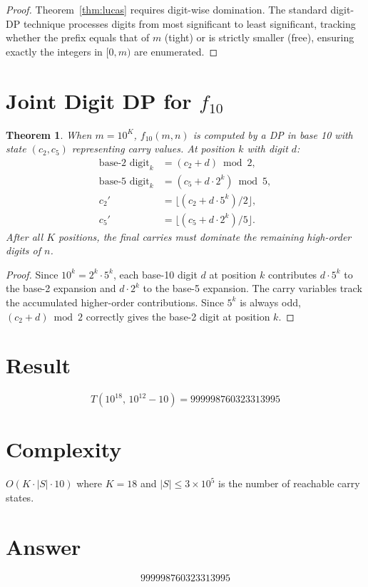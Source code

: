 \documentclass[12pt]{article}
\newtheorem{theorem}{Theorem}
\theoremstyle{definition}
\begin{document}
\begin{proof}
Theorem~\ref{thm:lucas} requires digit-wise domination.  The standard digit-DP technique processes digits from most significant to least significant, tracking whether the prefix equals that of $m$ (tight) or is strictly smaller (free), ensuring exactly the integers in $[0,m)$ are enumerated.
\end{proof}

\section{Joint Digit DP for \texorpdfstring{$f_{10}$}{f10}}

\begin{theorem}\label{thm:joint}
When $m=10^K$, $f_{10}(m,n)$ is computed by a DP in base 10 with state $(c_2,c_5)$ representing carry values.  At position $k$ with digit $d$:
\begin{align}
\text{base-2 digit}_k &= (c_2+d)\bmod 2, \\
\text{base-5 digit}_k &= (c_5+d\cdot 2^k)\bmod 5, \\
c_2' &= \lfloor(c_2+d\cdot 5^k)/2\rfloor, \\
c_5' &= \lfloor(c_5+d\cdot 2^k)/5\rfloor.
\end{align}
After all $K$ positions, the final carries must dominate the remaining high-order digits of $n$.
\end{theorem}

\begin{proof}
Since $10^k=2^k\cdot 5^k$, each base-10 digit $d$ at position $k$ contributes $d\cdot 5^k$ to the base-2 expansion and $d\cdot 2^k$ to the base-5 expansion.  The carry variables track the accumulated higher-order contributions.  Since $5^k$ is always odd, $(c_2+d)\bmod 2$ correctly gives the base-2 digit at position $k$.
\end{proof}

\section{Result}

\[
T(10^{18},\,10^{12}-10)=\boxed{999998760323313995}
\]

\section{Complexity}
$O(K\cdot|S|\cdot 10)$ where $K=18$ and $|S|\le 3\times 10^5$ is the number of reachable carry states.

\section{Answer}

\[
\boxed{999998760323313995}
\]
\end{document}
